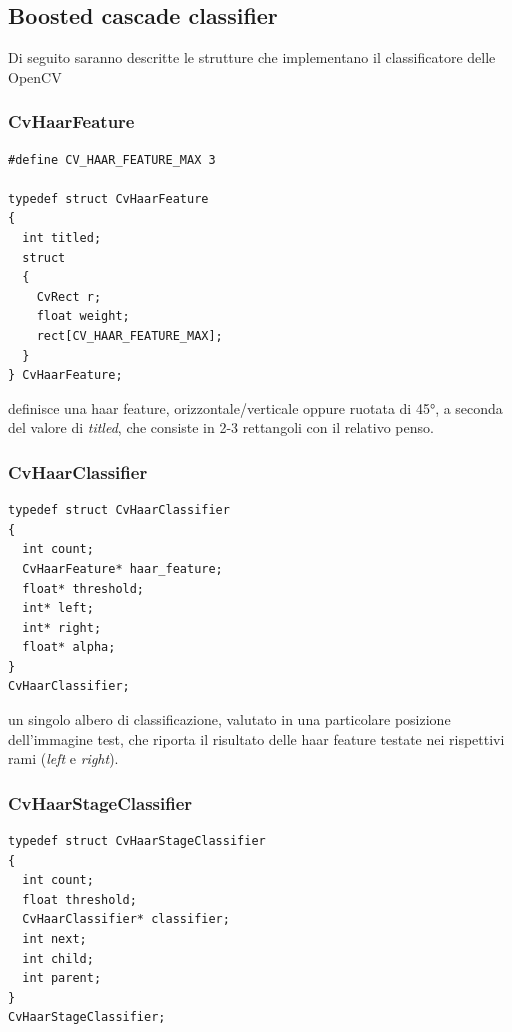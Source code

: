 \documentclass[a4paper,11pt]{article}
\newcommand{\cv}{OpenCV}
\begin{document}
\subsection{Boosted cascade classifier}
\label{sec:class}
Di seguito saranno descritte le strutture che implementano il
classificatore delle \cv{}

\subsubsection{CvHaarFeature}
\label{sec:cvhaarfeatyre}

\begin{lstlisting}
#define CV_HAAR_FEATURE_MAX 3

typedef struct CvHaarFeature
{
  int titled;
  struct
  {
    CvRect r;
    float weight;
    rect[CV_HAAR_FEATURE_MAX];
  }
} CvHaarFeature;
\end{lstlisting}

definisce una haar feature, orizzontale/verticale oppure ruotata di
\ang{45}, a seconda del valore di \emph{titled}, che consiste in 2-3
rettangoli con il relativo penso.

\subsubsection{CvHaarClassifier}
\label{sec:cvhaarclassifier}

\begin{lstlisting}
typedef struct CvHaarClassifier
{
  int count;
  CvHaarFeature* haar_feature;
  float* threshold;
  int* left;
  int* right;
  float* alpha;
}  
CvHaarClassifier;
\end{lstlisting}

un singolo albero di classificazione, valutato
in una particolare posizione dell'immagine test, che riporta il
risultato delle haar feature testate nei rispettivi rami (\emph{left}
e \emph{right}).

\subsubsection{CvHaarStageClassifier}
\label{sec:cvhaarstageclassifier}

\begin{lstlisting}
typedef struct CvHaarStageClassifier
{
  int count;
  float threshold;
  CvHaarClassifier* classifier;
  int next;
  int child;
  int parent;
} 
CvHaarStageClassifier;
\end{lstlisting}
\end{document}
